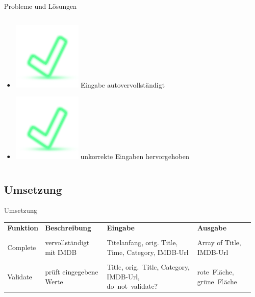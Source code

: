 \documentclass{beamer} %
\begin{document}
\begin{frame}{Probleme und Lösungen}
\begin{columns}[c]
\begin{column}{0.5\textwidth}
\begin{itemize}
						\pause
					\item \includegraphics[height=\baselineskip]{material/dialog-ok.png} Eingabe autovervollständigt
						\pause
					\item \includegraphics[height=\baselineskip]{material/dialog-ok.png} unkorrekte Eingaben hervorgehoben
				\end{itemize}
			\end{column}
		\end{columns}
	\end{frame}

	\subsection{Umsetzung}
	\begin{frame}{Umsetzung}
		\small
		\begin{tabular}{p{1.7cm} p{2.6cm} p{2.6cm} p{2.3cm} }
			\textbf{Funktion} & \textbf{Beschreibung} & \textbf{Eingabe} & \textbf{Ausgabe} \pause \\
			\\
			Complete & vervollständigt mit IMDB & Titelanfang, orig. Title, Time, Category, IMDB-Url & Array of {Title, IMDB-Url} \pause \\
			\\
			Validate & prüft eingegebene Werte & Title, orig.~Title, Category, IMDB-Url, do~not~validate? & rote~Fläche, grüne~Fläche \\
		\end{tabular}
	\end{frame}

\end{document}
